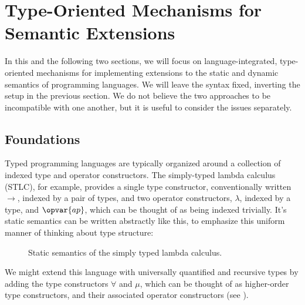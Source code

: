 


\section{Type-Oriented Mechanisms for Semantic Extensions}\label{att}

In this and the following two sections, we will focus on language-integrated, type-oriented mechanisms for implementing extensions to the static and dynamic semantics of programming languages. We will leave the syntax fixed, inverting the setup in the previous section. We do not believe  the two approaches to be incompatible with one another, but it is useful to consider the issues separately.

\subsection{Foundations}
Typed programming languages are typically organized around a collection of indexed type and operator constructors. The simply-typed lambda calculus (STLC), for example, provides a single type constructor, conventionally written $\rightarrow$, indexed by a pair of types, and two operator constructors, $\lambda$, indexed by a type, and $\opvar{ap}$, which can be thought of as being indexed trivially. It's static semantics can be written abstractly like this, to emphasize this uniform manner of thinking about type structure:
\begin{figure}[h]
\small
\vspace{-8pt}
\begin{mathpar}


\end{mathpar}
\vspace{-8pt}
\caption{Static semantics of the simply typed lambda calculus.}
\end{figure}

We might extend this language with universally quantified and recursive types by adding the type constructors $\forall$ and $\mu$, which can be thought of as higher-order type constructors, and their associated operator constructors (see \cite{pfpl}). 

